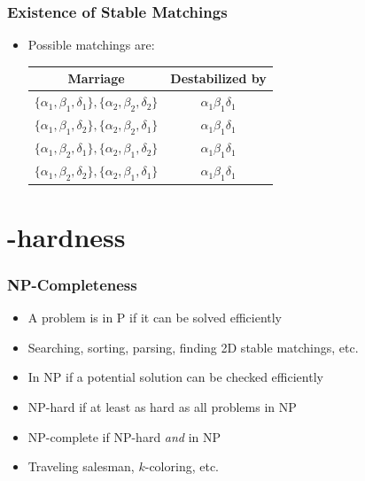 \documentclass[mathserif,serif]{beamer}
\begin{document}
\begin{frame}
  \frametitle{Existence of Stable Matchings}
  \begin{itemize}
  \item Possible matchings are:
    \begin{center}
      \begin{tabular}{c | c}
        Marriage & Destabilized by \\ \hline
        $\{\alpha_1, \beta_1, \delta_1\}, \{\alpha_2, \beta_2, \delta_2\}$ & $\alpha_1\beta_1\delta_1$ \\
        $\{\alpha_1, \beta_1, \delta_2\}, \{\alpha_2, \beta_2, \delta_1\}$ & $\alpha_1\beta_1\delta_1$ \\
        $\{\alpha_1, \beta_2, \delta_1\}, \{\alpha_2, \beta_1, \delta_2\}$ & $\alpha_1\beta_1\delta_1$ \\
        $\{\alpha_1, \beta_2, \delta_2\}, \{\alpha_2, \beta_1, \delta_1\}$ & $\alpha_1\beta_1\delta_1$ \\
      \end{tabular}
    \end{center}
  \end{itemize}
\end{frame}

\section{\NP-hardness}

\begin{frame}
  \frametitle{NP-Completeness}
  \begin{itemize}
  \item A problem is in P if it can be solved efficiently
  \item Searching, sorting, parsing, finding 2D stable matchings, etc.
  \item In NP if a potential solution can be checked efficiently
  \item NP-hard if at least as hard as all problems in NP
  \item NP-complete if NP-hard \emph{and} in NP
  \item Traveling salesman, $k$-coloring, etc.
  \end{itemize}
\end{frame}
\end{document}
